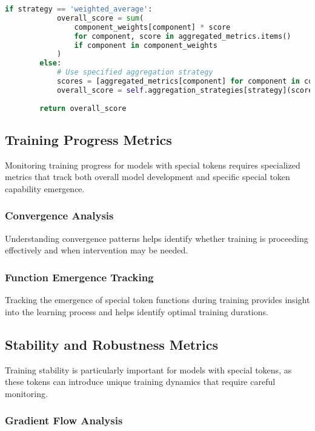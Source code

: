 \begin{lstlisting}[language=Python, caption=Comprehensive evaluation metrics framework for special token training]
        if strategy == 'weighted_average':
            overall_score = sum(
                component_weights[component] * score 
                for component, score in aggregated_metrics.items()
                if component in component_weights
            )
        else:
            # Use specified aggregation strategy
            scores = [aggregated_metrics[component] for component in component_weights.keys()]
            overall_score = self.aggregation_strategies[strategy](scores, list(component_weights.values()))
        
        return overall_score
\end{lstlisting}

\subsection{Training Progress Metrics}

Monitoring training progress for models with special tokens requires specialized metrics that track both overall model development and specific special token capability emergence.

\subsubsection{Convergence Analysis}

Understanding convergence patterns helps identify whether training is proceeding effectively and when intervention may be needed.

\subsubsection{Function Emergence Tracking}

Tracking the emergence of special token functions during training provides insight into the learning process and helps identify optimal training durations.

\subsection{Stability and Robustness Metrics}

Training stability is particularly important for models with special tokens, as these tokens can introduce unique training dynamics that require careful monitoring.

\subsubsection{Gradient Flow Analysis}

